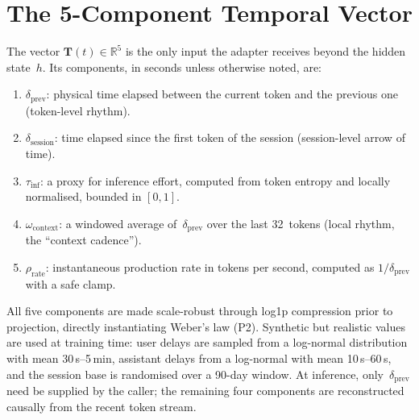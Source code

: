 \documentclass[10pt,twocolumn,letterpaper]{article}
\begin{document}
\section{The 5-Component Temporal Vector}

The vector $\mathbf{T}(t) \in \mathbb{R}^5$ is the only input the adapter receives beyond the hidden state~$h$. Its components, in seconds unless otherwise noted, are:

\begin{enumerate}[leftmargin=0.6cm, itemsep=2pt]
    \item $\delta_{\text{prev}}$: physical time elapsed between the current token and the previous one (token-level rhythm).
    \item $\delta_{\text{session}}$: time elapsed since the first token of the session (session-level arrow of time).
    \item $\tau_{\text{inf}}$: a proxy for inference effort, computed from token entropy and locally normalised, bounded in $[0,1]$.
    \item $\omega_{\text{context}}$: a windowed average of~$\delta_{\text{prev}}$ over the last 32~tokens (local rhythm, the ``context cadence'').
    \item $\rho_{\text{rate}}$: instantaneous production rate in tokens per second, computed as $1/\delta_{\text{prev}}$ with a safe clamp.
\end{enumerate}

All five components are made scale-robust through log1p compression prior to projection, directly instantiating Weber's law (P2). Synthetic but realistic values are used at training time: user delays are sampled from a log-normal distribution with mean 30\,s--5\,min, assistant delays from a log-normal with mean 10\,s--60\,s, and the session base is randomised over a 90-day window. At inference, only~$\delta_{\text{prev}}$ need be supplied by the caller; the remaining four components are reconstructed causally from the recent token stream.
\end{document}
